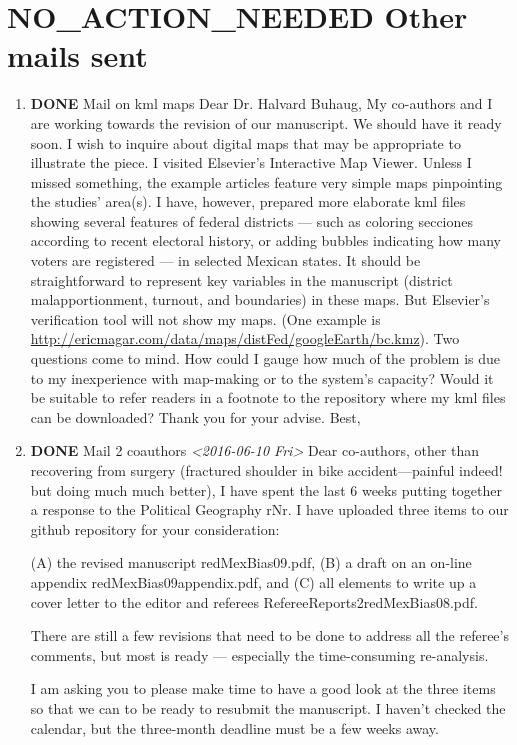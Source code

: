 \documentclass{article}
\begin{document}
\section{{\bfseries\sffamily NO\_ACTION\_NEEDED} Other mails sent}
\label{sec:orgheadline51}
\begin{enumerate}
\item {\bfseries\sffamily DONE} Mail on kml maps
\label{sec:orgheadline49}
Dear Dr. Halvard Buhaug, 
My co-authors and I are working towards the revision of our manuscript. We should have it ready soon. I wish to inquire about digital maps that may be appropriate to illustrate the piece. 
I visited Elsevier's Interactive Map Viewer. Unless I missed something, the example articles feature very simple maps pinpointing the studies' area(s). I have, however, prepared more elaborate kml files showing several features of federal districts --- such as coloring secciones according to recent electoral history, or adding bubbles indicating how many voters are registered --- in selected Mexican states. It should be straightforward to represent key variables in the manuscript (district malapportionment, turnout, and boundaries) in these maps. But Elsevier's verification tool will not show my maps. (One example is \url{http://ericmagar.com/data/maps/distFed/googleEarth/bc.kmz}).
Two questions come to mind. How could I gauge how much of the problem is due to my inexperience with map-making or to the system's capacity? Would it be suitable to refer readers in a footnote to the repository where my kml files can be downloaded?
Thank you for your advise.
Best,

\item {\bfseries\sffamily DONE} Mail 2 coauthors \textit{<2016-06-10 Fri>}
\label{sec:orgheadline50}
Dear co-authors, other than recovering from surgery (fractured shoulder in bike accident---painful indeed! but doing much much better), I have spent the last 6 weeks putting together a response to the Political Geography rNr. I have uploaded three items to our github repository for your consideration: 

(A) the revised manuscript redMexBias09.pdf, 
(B) a draft on an on-line appendix redMexBias09appendix.pdf, and 
(C) all elements to write up a cover letter to the editor and referees RefereeReports2redMexBias08.pdf.  

There are still a few revisions that need to be done to address all the referee's comments, but most is ready --- especially the time-consuming re-analysis. 

I am asking you to please make time to have a good look at the three items so that we can to be ready to resubmit the manuscript. I haven't checked the calendar, but the three-month deadline must be a few weeks away. 


\end{enumerate}
\end{document}
